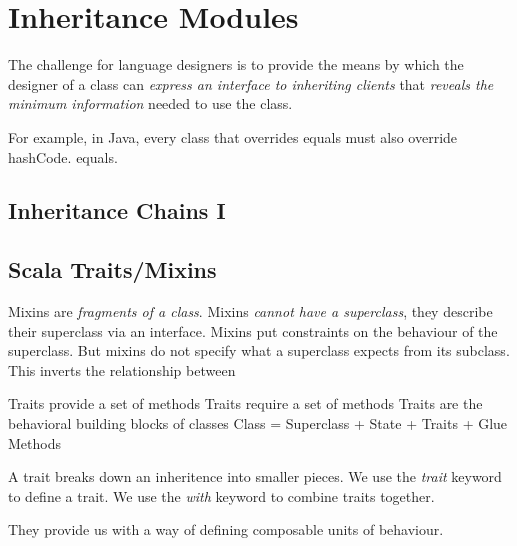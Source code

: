 
\chapter{Inheritance Modules}

The challenge for language designers is to provide the means by which the designer 
of a class can  \textit{express an interface to inheriting clients} 
that \textit{reveals the minimum information} needed to use the class.



For example, in Java, every class that overrides equals must also override hashCode.
equals.


\section{Inheritance Chains I}









\section{Scala Traits/Mixins}


Mixins are \textit{fragments of a class}.
Mixins \textit{cannot have a superclass}, they describe their superclass via an 
interface. Mixins put constraints on the behaviour of the superclass. 
But mixins do not specify what a superclass expects
from its subclass. This inverts the relationship between 

Traits provide a set of methods 
Traits require a set of methods
Traits are the behavioral building blocks of classes
Class = Superclass + State + Traits + Glue Methods

A trait breaks down an inheritence into smaller pieces.
We use the \textit{trait} keyword to define a trait.
We use the \textit{with} keyword to combine traits together. 

They provide us with a way of defining composable units of behaviour.

